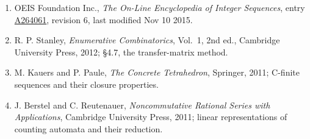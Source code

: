 \documentclass[11pt]{article}
\theoremstyle{definition}
\begin{document}
\begin{enumerate}

\item OEIS Foundation Inc., \emph{The On-Line Encyclopedia of Integer Sequences}, entry \href{https://oeis.org/A264061}{A264061}, revision 6, last modified Nov 10 2015.

\item R. P. Stanley, \emph{Enumerative Combinatorics}, Vol.~1, 2nd ed., Cambridge University Press, 2012; \S4.7, the transfer-matrix method.

\item M. Kauers and P. Paule, \emph{The Concrete Tetrahedron}, Springer, 2011; C-finite sequences and their closure properties.

\item J. Berstel and C. Reutenauer, \emph{Noncommutative Rational Series with Applications}, Cambridge University Press, 2011; linear representations of counting automata and their reduction.

\end{enumerate}
\end{document}
